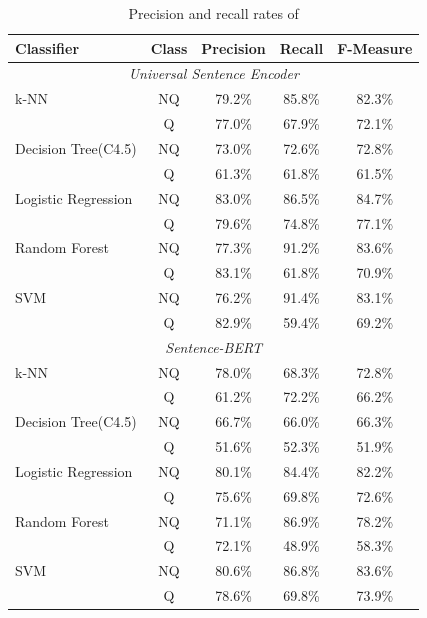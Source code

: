 \documentclass[conference]{IEEEtran}
\begin{document}
\begin{table}[h!b]
  \caption{Precision and recall rates of }
  \begin{center}
  \begin{tabular}{|l|c|c|c|c|}
  \hline
  \textbf{Classifier}&\textbf{Class}&\textbf{Precision}&\textbf{Recall}&\textbf{F-Measure}\\
  \hline
  \multicolumn{5}{|c|}{\textit{Universal Sentence Encoder}}\\
  \hline
  k-NN               &NQ&79.2\%&85.8\%&82.3\%\\
                     &Q &77.0\%&67.9\%&72.1\%\\
  \hline
  Decision Tree(C4.5)&NQ&73.0\%&72.6\%&72.8\%\\
                     &Q &61.3\%&61.8\%&61.5\%\\
  \hline
  Logistic Regression&NQ&83.0\%&86.5\%&84.7\%\\
                     &Q &79.6\%&74.8\%&77.1\%\\
  \hline
  Random Forest      &NQ&77.3\%&91.2\%&83.6\%\\
                     &Q &83.1\%&61.8\%&70.9\%\\
  \hline
  SVM                &NQ&76.2\%&91.4\%&83.1\%\\
                     &Q &82.9\%&59.4\%&69.2\%\\
  \hline
  \multicolumn{5}{|c|}{\textit{Sentence-BERT}}\\
  \hline
  k-NN               &NQ&78.0\%&68.3\%&72.8\%\\
                     &Q &61.2\%&72.2\%&66.2\%\\
  \hline                     
  Decision Tree(C4.5)&NQ&66.7\%&66.0\%&66.3\%\\
                     &Q &51.6\%&52.3\%&51.9\%\\
  \hline                   
  Logistic Regression&NQ&80.1\%&84.4\%&82.2\%\\
                     &Q &75.6\%&69.8\%&72.6\%\\ 
  \hline
  Random Forest      &NQ&71.1\%&86.9\%&78.2\%\\ 
                     &Q &72.1\%&48.9\%&58.3\%\\
  \hline                   
  SVM                &NQ&80.6\%&86.8\%&83.6\%\\
                     &Q &78.6\%&69.8\%&73.9\%\\ 
  \hline
  \end{tabular}
  \end{center}
  \label{tab:results2}
\end{table}
\end{document}
